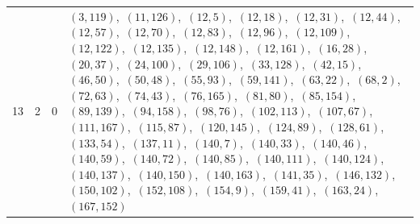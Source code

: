\documentclass[11pt]{article}
\begin{document}
\begin{longtable}{@{}rrl>{\raggedright\arraybackslash}p{}@{}}
13 & 2 & $0$ & $(3,119)$,\allowbreak\ $(11,126)$,\allowbreak\ $(12,5)$,\allowbreak\ $(12,18)$,\allowbreak\ $(12,31)$,\allowbreak\ $(12,44)$,\allowbreak\ $(12,57)$,\allowbreak\ $(12,70)$,\allowbreak\ $(12,83)$,\allowbreak\ $(12,96)$,\allowbreak\ $(12,109)$,\allowbreak\ $(12,122)$,\allowbreak\ $(12,135)$,\allowbreak\ $(12,148)$,\allowbreak\ $(12,161)$,\allowbreak\ $(16,28)$,\allowbreak\ $(20,37)$,\allowbreak\ $(24,100)$,\allowbreak\ $(29,106)$,\allowbreak\ $(33,128)$,\allowbreak\ $(42,15)$,\allowbreak\ $(46,50)$,\allowbreak\ $(50,48)$,\allowbreak\ $(55,93)$,\allowbreak\ $(59,141)$,\allowbreak\ $(63,22)$,\allowbreak\ $(68,2)$,\allowbreak\ $(72,63)$,\allowbreak\ $(74,43)$,\allowbreak\ $(76,165)$,\allowbreak\ $(81,80)$,\allowbreak\ $(85,154)$,\allowbreak\ $(89,139)$,\allowbreak\ $(94,158)$,\allowbreak\ $(98,76)$,\allowbreak\ $(102,113)$,\allowbreak\ $(107,67)$,\allowbreak\ $(111,167)$,\allowbreak\ $(115,87)$,\allowbreak\ $(120,145)$,\allowbreak\ $(124,89)$,\allowbreak\ $(128,61)$,\allowbreak\ $(133,54)$,\allowbreak\ $(137,11)$,\allowbreak\ $(140,7)$,\allowbreak\ $(140,33)$,\allowbreak\ $(140,46)$,\allowbreak\ $(140,59)$,\allowbreak\ $(140,72)$,\allowbreak\ $(140,85)$,\allowbreak\ $(140,111)$,\allowbreak\ $(140,124)$,\allowbreak\ $(140,137)$,\allowbreak\ $(140,150)$,\allowbreak\ $(140,163)$,\allowbreak\ $(141,35)$,\allowbreak\ $(146,132)$,\allowbreak\ $(150,102)$,\allowbreak\ $(152,108)$,\allowbreak\ $(154,9)$,\allowbreak\ $(159,41)$,\allowbreak\ $(163,24)$,\allowbreak\ $(167,152)$\\

\end{longtable}
\end{document}
